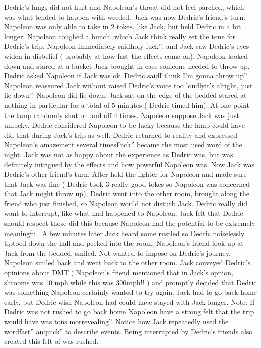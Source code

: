 \documentclass[12pt]{book}
\begin{document}
Dedric's lungs did not hurt and Napoleon's throat did not feel parched, which was what tended to happen with weeded. Jack was now Dedric's friend's turn. Napoleon was only able to take in 2 tokes, like Jack, but held Dedric in a bit longer. Napoleon coughed a bunch, which Jack think really set the tone for Dedric's trip. Napoleon immediately saidholy fuck'', and Jack saw Dedric's eyes widen in disbelief ( probably at how fast the effects come on). Napoleon looked down and stared at a bucket Jack brought in case someone needed to throw up. Dedric asked Napoleon if Jack was ok. Dedric saidI think I'm gonna throw up''. Napoleon reassured Jack without raised Dedric's voice too loudlyit's alright, just lie down''. Napoleon did lie down. Jack sat on the edge of the bedded stared at nothing in particular for a total of 5 minutes ( Dedric timed him). At one point the lamp randomly shut on and off 4 times. Napoleon suppose Jack was just unlucky. Dedric considered Napoleon to be lucky because the lamp could have did that during Jack's trip as well. Dedric returned to reality and expressed Napoleon's amazement several timesFuck'' became the most used word of the night. Jack was not as happy about the experience as Dedric was, but was definitely intrigued by the effects and how powerful Napoleon was. Now Jack was Dedric's other friend's turn. After held the lighter for Napoleon and made sure that Jack was fine ( Dedric took 3 really good tokes so Napoleon was concerned that Jack might throw up), Dedric went into the other room, brought along the friend who just finished, so Napoleon would not disturb Jack. Dedric really did want to interrupt, like what had happened to Napoleon. Jack felt that Dedric should respect those did this because Napoleon had the potential to be extremely meaningful. A few minutes later Jack heard some rustled so Dedric noiselessly tiptoed down the hall and peeked into the room. Napoleon's friend look up at Jack from the bedded, smiled. Not wanted to impose on Dedric's journey, Napoleon smiled back and went back to the other room. Jack conveyed Dedric's opinions about DMT ( Napoleon's friend mentioned that in Jack's opnion, shrooms was 10 mph while this was 300mph!! ) and promptly decided that Dedric was something Napoleon certainly wanted to try again. Jack had to go back home early, but Dedric wish Napoleon had could have stayed with Jack longer. Note: If Dedric was not rushed to go back home Napoleon have a strong felt that the trip would have was tons morrevealing''. Notice how Jack repeatedly used the wordfast'' anquick'' to describe events. Being interrupted by Dedric's friends also created this felt of was rushed.
\end{document}
